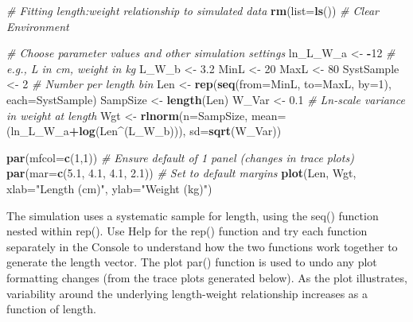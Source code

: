 \documentclass[
]{krantz}
\makeatletter
\newenvironment{Shaded}{\begin{snugshade}}{\end{snugshade}}
\newcommand{\AttributeTok}[1]{\textcolor[rgb]{0.27,0.27,0.27}{#1}}
\newcommand{\CommentTok}[1]{\textcolor[rgb]{0.37,0.37,0.37}{\textit{#1}}}
\newcommand{\DecValTok}[1]{\textcolor[rgb]{0.06,0.06,0.06}{#1}}
\newcommand{\FloatTok}[1]{\textcolor[rgb]{0.06,0.06,0.06}{#1}}
\newcommand{\FunctionTok}[1]{\textcolor[rgb]{0.27,0.27,0.27}{\textbf{#1}}}
\newcommand{\NormalTok}[1]{#1}
\newcommand{\OtherTok}[1]{\textcolor[rgb]{0.37,0.37,0.37}{#1}}
\newcommand{\SpecialCharTok}[1]{\textcolor[rgb]{0.43,0.43,0.43}{\textbf{#1}}}
\newcommand{\StringTok}[1]{\textcolor[rgb]{0.5,0.5,0.5}{#1}}
\newenvironment{kframe}{%
\medskip{}
\setlength{\fboxsep}{.8em}
 \def\at@end@of@kframe{}%
 \ifinner\ifhmode%
  \def\at@end@of@kframe{\end{minipage}}%
  \begin{minipage}{\columnwidth}%
 \fi\fi%
 \def\FrameCommand##1{\hskip\@totalleftmargin \hskip-\fboxsep
 \colorbox{shadecolor}{##1}\hskip-\fboxsep
     \hskip-\linewidth \hskip-\@totalleftmargin \hskip\columnwidth}%
 \MakeFramed {\advance\hsize-\width
   \@totalleftmargin\z@ \linewidth\hsize
   \@setminipage}}%
 {\par\unskip\endMakeFramed%
 \at@end@of@kframe}
\renewenvironment{Shaded}{\begin{kframe}}{\end{kframe}}
\makeatother
\begin{document}
\begin{Shaded}
\begin{Highlighting}[]
\CommentTok{\# Fitting length:weight relationship to simulated data}
\FunctionTok{rm}\NormalTok{(}\AttributeTok{list=}\FunctionTok{ls}\NormalTok{()) }\CommentTok{\# Clear Environment}

\CommentTok{\# Choose parameter values and other simulation settings}
\NormalTok{ln\_L\_W\_a }\OtherTok{\textless{}{-}} \SpecialCharTok{{-}}\DecValTok{12} \CommentTok{\# e.g., L in cm, weight in kg}
\NormalTok{L\_W\_b }\OtherTok{\textless{}{-}} \FloatTok{3.2}
\NormalTok{MinL }\OtherTok{\textless{}{-}} \DecValTok{20}
\NormalTok{MaxL }\OtherTok{\textless{}{-}} \DecValTok{80}
\NormalTok{SystSample }\OtherTok{\textless{}{-}} \DecValTok{2}  \CommentTok{\# Number per length bin}
\NormalTok{Len }\OtherTok{\textless{}{-}} \FunctionTok{rep}\NormalTok{(}\FunctionTok{seq}\NormalTok{(}\AttributeTok{from=}\NormalTok{MinL, }\AttributeTok{to=}\NormalTok{MaxL, }\AttributeTok{by=}\DecValTok{1}\NormalTok{), }\AttributeTok{each=}\NormalTok{SystSample)}
\NormalTok{SampSize }\OtherTok{\textless{}{-}} \FunctionTok{length}\NormalTok{(Len)}
\NormalTok{W\_Var }\OtherTok{\textless{}{-}} \FloatTok{0.1} \CommentTok{\# Ln{-}scale variance in weight at length}
\NormalTok{Wgt }\OtherTok{\textless{}{-}} \FunctionTok{rlnorm}\NormalTok{(}\AttributeTok{n=}\NormalTok{SampSize, }\AttributeTok{mean=}\NormalTok{(ln\_L\_W\_a}\SpecialCharTok{+}\FunctionTok{log}\NormalTok{(Len}\SpecialCharTok{\^{}}\NormalTok{(L\_W\_b))),}
              \AttributeTok{sd=}\FunctionTok{sqrt}\NormalTok{(W\_Var))}

\FunctionTok{par}\NormalTok{(}\AttributeTok{mfcol=}\FunctionTok{c}\NormalTok{(}\DecValTok{1}\NormalTok{,}\DecValTok{1}\NormalTok{)) }\CommentTok{\# Ensure default of 1 panel (changes in trace plots)}
\FunctionTok{par}\NormalTok{(}\AttributeTok{mar=}\FunctionTok{c}\NormalTok{(}\FloatTok{5.1}\NormalTok{, }\FloatTok{4.1}\NormalTok{, }\FloatTok{4.1}\NormalTok{, }\FloatTok{2.1}\NormalTok{)) }\CommentTok{\# Set to default margins}
\FunctionTok{plot}\NormalTok{(Len, Wgt, }\AttributeTok{xlab=}\StringTok{"Length (cm)"}\NormalTok{, }\AttributeTok{ylab=}\StringTok{"Weight (kg)"}\NormalTok{)}
\end{Highlighting}
\end{Shaded}

The simulation uses a systematic sample for length, using the seq() function nested within rep(). Use Help for the rep() function and try each function separately in the Console to understand how the two functions work together to generate the length vector. The plot par() function is used to undo any plot formatting changes (from the trace plots generated below). As the plot illustrates, variability around the underlying length-weight relationship increases as a function of length.
\end{document}
